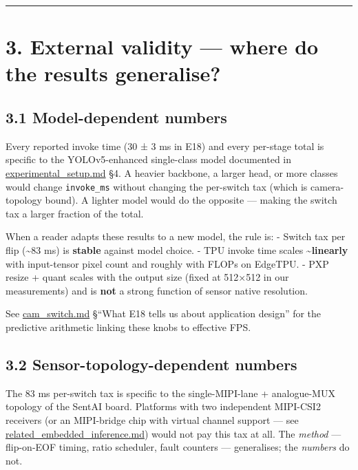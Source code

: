 \begin{center}\rule{0.5\linewidth}{0.5pt}\end{center}

\section{3. External validity --- where do the results
generalise?}\label{external-validity-where-do-the-results-generalise}

\subsection{3.1 Model-dependent numbers}\label{model-dependent-numbers}

Every reported invoke time (30 ± 3 ms in E18) and every per-stage total
is specific to the YOLOv5-enhanced single-class model documented in
\url{experimental_setup.md} §4. A heavier backbone, a larger head, or
more classes would change \texttt{invoke\_ms} without changing the
per-switch tax (which is camera- topology bound). A lighter model would
do the opposite --- making the switch tax a larger fraction of the
total.

When a reader adapts these results to a new model, the rule is: - Switch
tax per flip (\textasciitilde83 ms) is \textbf{stable} against model
choice. - TPU invoke time scales \textbf{\textasciitilde linearly} with
input-tensor pixel count and roughly with FLOPs on EdgeTPU. - PXP resize
+ quant scales with the output size (fixed at 512×512 in our
measurements) and is \textbf{not} a strong function of sensor native
resolution.

See \url{cam_switch.md} §``What E18 tells us about application design''
for the predictive arithmetic linking these knobs to effective FPS.

\subsection{3.2 Sensor-topology-dependent
numbers}\label{sensor-topology-dependent-numbers}

The 83 ms per-switch tax is specific to the single-MIPI-lane +
analogue-MUX topology of the SentAI board. Platforms with two
independent MIPI-CSI2 receivers (or an MIPI-bridge chip with virtual
channel support --- see \url{related_embedded_inference.md}) would not
pay this tax at all. The \emph{method} --- flip-on-EOF timing, ratio
scheduler, fault counters --- generalises; the \emph{numbers} do not.

